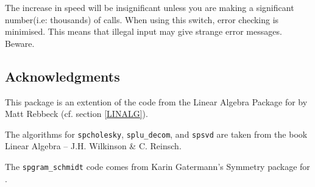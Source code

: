 The increase in speed will be insignificant unless you are making a
significant number(i.e: thousands) of calls. When using this switch,
error checking is minimised. This means that illegal input may give
strange error messages. Beware.

\subsection{Acknowledgments}
This package is an extention of the code from the Linear Algebra Package
for \REDUCE{} by Matt Rebbeck (cf. section \ref{LINALG}).

The algorithms for \texttt{spcholesky}, \texttt{splu\_decom}, and \texttt{spsvd} are
taken from the book Linear Algebra -- J.H. Wilkinson \& C. Reinsch.

The \texttt{spgram\_schmidt} code comes from Karin Gatermann's Symmetry
package for {\REDUCE}.
